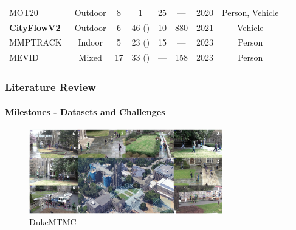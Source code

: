 \begin{frame}
\begin{table}[ht]
{\begin{tabular}{|l|c|c|c|c|c|c|c|c|}
				MOT20~\cite{Dendorfer20}               & Outdoor              & 8                          & 1                                  & 25           & ---          & 2020          & Person, Vehicle \\
				\textbf{CityFlowV2}~\cite{Tang19}      & Outdoor              & 6                          & 46 (\cmark)                        & 10           & 880          & 2021          & Vehicle         \\
				MMPTRACK~\cite{Han23}                  & Indoor               & 5                          & 23 (\cmark)                        & 15           & ---          & 2023          & Person          \\
				MEVID~\cite{Davila23}                  & Mixed                & 17                         & 33 (\cmark)                        & ---          & 158          & 2023          & Person          \\
				\hline
			\end{tabular}
		}
	\end{table}

\end{frame}

\begin{frame}
	\frametitle{Literature Review}
	\framesubtitle{Milestones - Datasets and Challenges}

	\begin{figure}[ht]
		\centering
		\includegraphics[width=0.75\textwidth]{resources/fig/Ma21-dukemtmc.png}
		\caption[DukeMTMC]{DukeMTMC~\cite[Fig.~2]{Ma21}}\label{fig:dukemtmc}
	\end{figure}
\end{frame}

